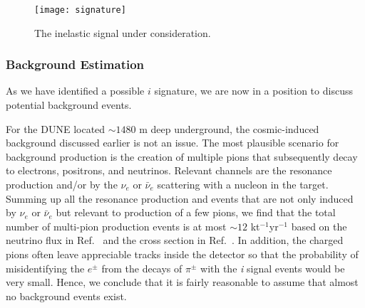 \begin{figure}[t]
\centering
\texttt{[image: signature]}
\caption{\label{fig:sig} The inelastic  signal under consideration.}
\end{figure}

\subsubsection{Background Estimation}

As we have identified a possible $i$ signature, we are now in a position to discuss potential  background events. 



For the DUNE  located $\sim 1480$ m deep underground, the cosmic-induced background discussed earlier is not an issue. 
The most plausible scenario for background production is the creation of multiple pions that subsequently decay to electrons, positrons, and neutrinos. 
Relevant channels are the resonance production and/or  by the  $\nu_e$ or $\bar \nu_e$ scattering with a nucleon in the \lar target.
Summing up all the resonance production and  events that are not only induced by $\nu_e$ or $\bar \nu_e$ 
but relevant to production of a few pions, we find that the total number of multi-pion production events is at most $\sim 12$ kt$^{-1}$yr$^{-1}$ based on the neutrino flux in Ref.~\cite{Honda:2015fha} and the cross section in Ref.~\cite{Formaggio:2013kya}.
In addition, the charged pions often leave appreciable tracks inside the detector so that the probability of misidentifying the $e^\pm$ from the decays of $\pi^\pm$ with the \textit{i} signal events would be very small.
Hence, we conclude that it is fairly reasonable to assume that almost no background events exist.

